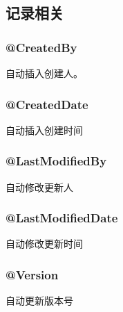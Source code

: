 \subsection{记录相关}

\subsubsection{@CreatedBy}

自动插入创建人。

\subsubsection{@CreatedDate}

自动插入创建时间

\subsubsection{@LastModifiedBy}

自动修改更新人

\subsubsection{@LastModifiedDate}

自动修改更新时间

\subsubsection{@Version}

自动更新版本号

\newpage